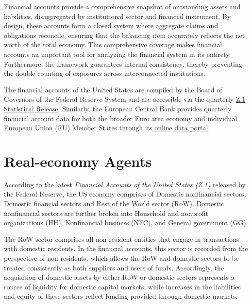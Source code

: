 Financial accounts provide a comprehensive snapshot of outstanding assets and liabilities, disaggregated by institutional sector and financial instrument. By design, these accounts form a closed system where aggregate claims and obligations reconcile, ensuring that the balancing item accurately reflects the net worth of the total economy. This comprehensive coverage makes financial accounts an important tool for analyzing the financial system in its entirety. Furthermore, the framework guarantees internal consistency, thereby preventing the double counting of exposures across interconnected institutions. 

The financial accounts of the United States are compiled by the Board of Governors of the Federal Reserve System and are accessible via the quarterly \href{https://www.federalreserve.gov/releases/z1/}{Z.1 Statistical Release}. Similarly, the European Central Bank provides quarterly financial account data for both the broader Euro area economy and individual European Union (EU) Member States through its \href{https://data.ecb.europa.eu/data/publications/EAA02_02/data-information?publications_array%5B0%5D=EAA02_02&layerType=AL}{online data portal}.

\section{Real-economy Agents}
\label{Section 3.1.2}

According to the latest \textit{Financial Accounts of the United States (Z.1)} released by the Federal Reserve, \nocite{board_of_governors_of_the_federal_reserve_system_financial_2026}the US economy comprises of Domestic nonfinancial sectors, Domestic financial sectors and Rest of the World sector (RoW). Domestic nonfinancial sectors are further broken into Household and nonprofit organizations (HH), Nonfinancial business (NFC), and General government (GG). 

The RoW sector comprises all non-resident entities that engage in transactions with domestic residents. In the financial accounts, this sector is recorded from the perspective of non-residents, which allows the RoW and domestic sectors to be treated consistently as both suppliers and users of funds. Accordingly, the acquisition of domestic assets by either RoW or domestic sectors represents a source of liquidity for domestic capital markets, while increases in the liabilities and equity of these sectors reflect funding provided through domestic markets.

